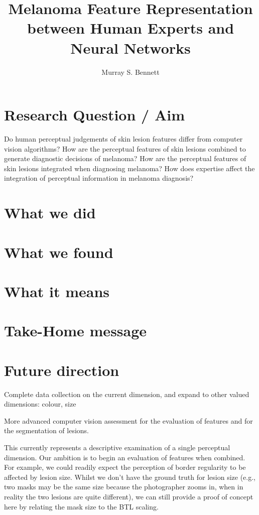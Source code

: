 \documentclass[a4paper, natbib, doc, 12pt]{apa7}
\title{Melanoma Feature Representation between Human Experts and Neural Networks}
\author{Murray S. Bennett}
\begin{document}
\maketitle

\setlength{\parskip}{0pt}


\newpage
\section{Research Question / Aim}
Do human perceptual judgements of skin lesion features differ from computer vision algorithms?
How are the perceptual features of skin lesions combined to generate diagnostic decisions of melanoma?
How are the perceptual features of skin lesions integrated when diagnosing melanoma?
How does expertise affect the integration of perceptual information in melanoma diagnosis?

\section{What we did}



\section{What we found}


\section{What it means}


\section{Take-Home message}


\section{Future direction}
Complete data collection on the current dimension, and expand to other valued dimensions: colour, size

More advanced computer vision assessment for the evaluation of features and for the segmentation of lesions.

This currently represents a descriptive examination of a single perceptual dimension. Our ambition is to begin an evaluation of features when combined. For example, we could readily expect the perception of border regularity to be affected by lesion size. Whilst we don't have the ground truth for lesion size (e.g., two masks may be the same size because the photographer zooms in, when in reality the two lesions are quite different), we can still provide a proof of concept here by relating the mask size to the BTL scaling.
\end{document}
